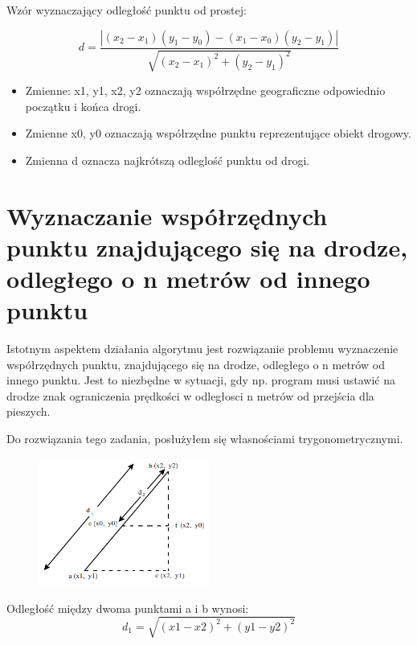 Wzór wyznaczający odległość punktu od prostej:

\begin{equation} \label{eq:distancePointLineal}
d = \frac{| (x_2 - x_1)(y_1 - y_0) - (x_1 - x_0)(y_2 - y_1) |}{\sqrt{(x_2 - x_1)^2 + (y_2 - y_1)^2}}
\end{equation}\newline

\begin{itemize}
\item Zmienne: x1, y1, x2, y2 oznaczają współrzędne geograficzne odpowiednio początku i końca drogi. 
\item Zmienne x0, y0 oznaczają współrzędne punktu reprezentujące obiekt drogowy.
\item Zmienna d oznacza najkrótszą odleglość punktu od drogi.  
\end{itemize}


\newpage
\section{Wyznaczanie współrzędnych punktu znajdującego się na drodze, odległego o n metrów od innego punktu}
\label{sec:pointCoordinatesFromAnotherPoint}

Istotnym aspektem działania algorytmu jest rozwiązanie problemu wyznaczenie współrzędnych punktu, znajdującego się na drodze, odległego o n metrów od innego punktu.  Jest to niezbędne w sytuacji, gdy np. program musi ustawić na drodze znak ograniczenia prędkości w odległosci n metrów od przejścia dla pieszych.

Do rozwiązania tego zadania, posłużyłem się własnościami trygonometrycznymi.


\begin{figure}[h]
\label{odlegloscPktProsta}
\centering
\includegraphics[width=0.5\textwidth]{distance}
\end{figure}

Odległość między dwoma punktami a i b wynosi:
\begin{equation} \label{eq:distanceBetweenTwoPoint}
d_1 = \sqrt{(x1 - x2)^2 + (y1 - y2)^2}
\end{equation}\newline


